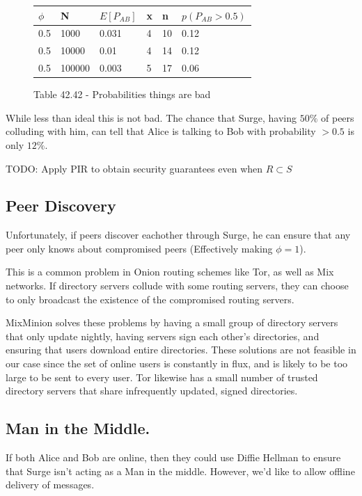 \documentclass{paper}
\begin{document}
\begin{figure}[ht]
    \begin{tabular}{| l | l | l | l | l | l |}
      \hline
      $\phi$ & N & $E[P_{AB}]$ & x & n & $p(P_{AB} > 0.5)$ \\\hline
      0.5 & 1000 & 0.031 & 4 & 10 & 0.12\\
      0.5 & 10000 & 0.01 & 4 & 14 & 0.12\\
      0.5 & 100000 & 0.003 & 5 & 17 & 0.06\\
      \hline
    \end{tabular}
    \caption{Table 42.42 - Probabilities things are bad}
\end{figure}

While less than ideal this is not bad. The chance that Surge, having $50\%$ of peers colluding with him, can tell that Alice is talking to Bob with probability $> 0.5$ is only $12\%$. 

TODO: Apply PIR to obtain security guarantees even when $R \subset S$

\subsection{Peer Discovery}
Unfortunately, if peers discover eachother through Surge, he can ensure that any peer only knows about compromised peers (Effectively making $\phi = 1$).

This is a common problem in Onion routing schemes like Tor, as well as Mix networks. If directory servers collude with some routing servers, they can choose to only broadcast the existence of the compromised routing servers.

MixMinion \cite{minion-design} solves these problems by having a small group of directory servers that only update nightly, having servers sign each other's directories, and ensuring that users download entire directories. These solutions are not feasible in our case since the set of online users is constantly in flux, and is likely to be too large to be sent to every user. Tor \cite{tor-design} likewise has a small number of trusted directory servers that share infrequently updated, signed directories.

\subsection{Man in the Middle.} If both Alice and Bob are online, then they could use Diffie Hellman to ensure that Surge isn't acting as a Man in the middle. However, we'd like to allow offline delivery of messages.
\end{document}

